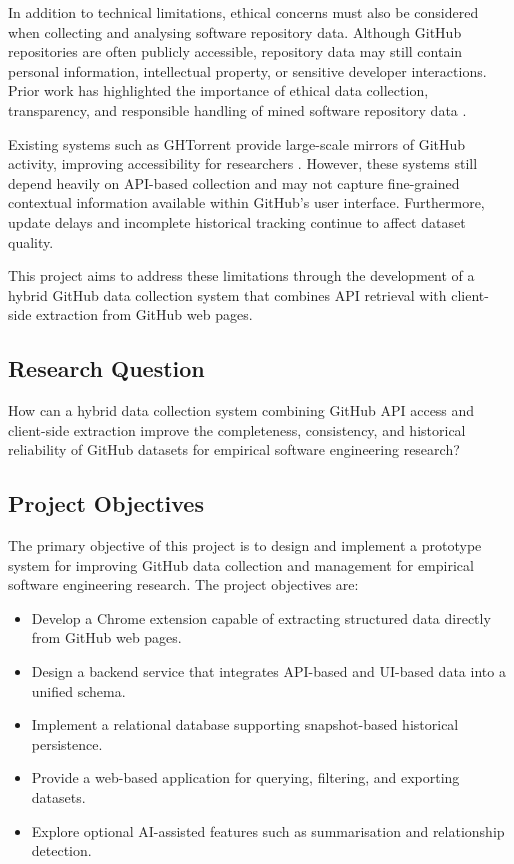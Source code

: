 \documentclass[conference]{IEEEtran}
\begin{document}
In addition to technical limitations, ethical concerns must also be considered when collecting and analysing software repository data. Although GitHub repositories are often publicly accessible, repository data may still contain personal information, intellectual property, or sensitive developer interactions. Prior work has highlighted the importance of ethical data collection, transparency, and responsible handling of mined software repository data \cite{andrews2001,gold2022,gogoll2021}.

Existing systems such as GHTorrent provide large-scale mirrors of GitHub activity, improving accessibility for researchers \cite{gousios2017}. However, these systems still depend heavily on API-based collection and may not capture fine-grained contextual information available within GitHub's user interface. Furthermore, update delays and incomplete historical tracking continue to affect dataset quality.

This project aims to address these limitations through the development of a hybrid GitHub data collection system that combines API retrieval with client-side extraction from GitHub web pages.

\subsection{Research Question}
How can a hybrid data collection system combining GitHub API access and client-side extraction improve the completeness, consistency, and historical reliability of GitHub datasets for empirical software engineering research?

\subsection{Project Objectives}
The primary objective of this project is to design and implement a prototype system for improving GitHub data collection and management for empirical software engineering research. The project objectives are:

\begin{itemize}
    \item Develop a Chrome extension capable of extracting structured data directly from GitHub web pages.
    \item Design a backend service that integrates API-based and UI-based data into a unified schema.
    \item Implement a relational database supporting snapshot-based historical persistence.
    \item Provide a web-based application for querying, filtering, and exporting datasets.
    \item Explore optional AI-assisted features such as summarisation and relationship detection.
\end{itemize}
\end{document}
